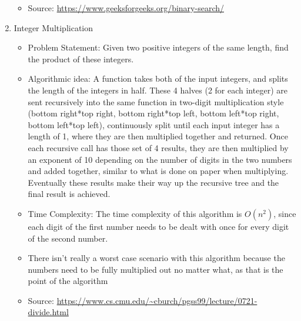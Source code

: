 \documentclass[11pt]{article}
\begin{document}
\begin{enumerate}
\begin{itemize}
\item Source: \url{https://www.geeksforgeeks.org/binary-search/}
\end{itemize}

\newpage

\item Integer Multiplication

\begin{itemize}
\item Problem Statement: Given two positive integers of the same length, find the product of these integers.

\item Algorithmic idea: A function takes both of the input integers, and splits the length of the integers in half. These 4 halves (2 for each integer) are sent recursively into the same function in two-digit multiplication style (bottom right*top right, bottom right*top left, bottom left*top right, bottom left*top left), continuously split until each input integer has a length of 1, where they are then multiplied together and returned. Once each recursive call has those set of 4 results, they are then multiplied by an exponent of 10 depending on the number of digits in the two numbers and added together, similar to what is done on paper when multiplying. Eventually these results make their way up the recursive tree and the final result is achieved.

\item Time Complexity: The time complexity of this algorithm is $O(n^2)$, since each digit of the first number needs to be dealt with once for every digit of the second number.

\item There isn't really a worst case scenario with this algorithm because the numbers need to be fully multiplied out no matter what, as that is the point of the algorithm

\item Source: \url{https://www.cs.cmu.edu/~cburch/pgss99/lecture/0721-divide.html}
\end{itemize}

\end{enumerate}
\end{document}
